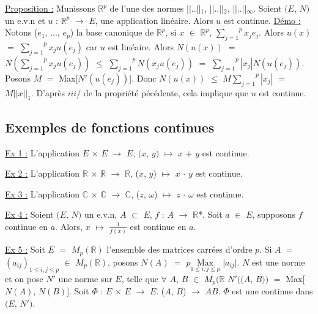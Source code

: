 \documentclass{article}
\begin{document}
\parindent=0cm
\smallbreak
\underline{Proposition :} \parindent=1cm \smallbreak
Munissons $\mathbb{R}^p$ de l'une des normes ||..||$_1$, ||..||$_2$, ||..||$_{\infty}$. Soient $(E$, $N)$ un e.v.n et $u$ : $\mathbb{R}^p$ $\longrightarrow$ $E$, une \smallbreak application linéaire. Alors $u$ est continue.
\parindent=0cm
\smallbreak
\underline{Démo :} \parindent=1cm \smallbreak
Notons ($e_1$, ..., $e_p$) la base canonique de $\mathbb{R}^p$, si $x$ $\in$ $\mathbb{R}^p$, $\overset{p}{\underset{j = 1}{\sum}}x_j e_j$. Alors $u(x)$ $=$ $\overset{p}{\underset{j = 1}{\sum}}x_j u(e_j)$ car $u$ est linéaire. \smallbreak Alors $N(u(x))$ $=$ $N( \overset{p}{\underset{j = 1}{\sum}}x_j u(e_j))$ $\leqslant$ 
$ \overset{p}{\underset{j = 1}{\sum}}N(x_j u(e_j))$ $=$ $ \overset{p}{\underset{j = 1}{\sum}}|x_j|N(u(e_j))$. Posons $M$ $=$ Max[$N'(u(e_j))$]. Donc \smallbreak $N(u(x))$ $\leqslant$ $M \overset{p}{\underset{j = 1}{\sum}}|x_j|$ $=$ $M||x||_1$. D'après $iii/$ de la propriété pécédente, cela implique que $u$ est continue.

\subsection{Exemples de fonctions continues}
\parindent=0cm
\smallbreak
\underline{Ex 1 :} \parindent=1cm \smallbreak
L'application $E$ $\times$ $E$ $\longrightarrow$ $E$, $(x$, $y)$ $\mapsto$ $x$ $+$ $y$ est continue.

\parindent=0cm
\smallbreak
\underline{Ex 2 :} \parindent=1cm \smallbreak
L'application $\mathbb{R}$ $\times$ $\mathbb{R}$ $\longrightarrow$ $\mathbb{R}$, ($x$, $y$) $\mapsto$ $x$ $\cdot$ $y$ est continue.

\parindent=0cm
\smallbreak
\underline{Ex 3 :} \parindent=1cm \smallbreak
L'application $\mathbb{C}$ $\times$ $\mathbb{C}$ $\longrightarrow$ $\mathbb{C}$, ($z$, $\omega$) $\mapsto$ $z$ $\cdot$ $\omega$ est continue.

\parindent=0cm
\smallbreak
\underline{Ex 4 :} \parindent=1cm \smallbreak
Soient $(E$, $N)$ un e.v.n, $A$ $\subset$ $E$, $f$ : $A$ $\longrightarrow$ $\mathbb{R}$*. Soit $a$ $\in$ $E$, supposons $f$ continue en $a$. Alors, $x$ $\mapsto$ $\frac{1}{f(x)}$ \smallbreak est continue en $a$.

\parindent=0cm
\smallbreak
\underline{Ex 5 :} \parindent=1cm \smallbreak
Soit $E$ $=$ $M_p(\mathbb{R})$ l'ensemble des matrices carrées d'ordre $p$. Si $A$ $=$ $(a_{ij})_{1 \leqslant i,j \leqslant p}$ $\in$ $M_p(\mathbb{R})$, posons \smallbreak $N(A)$ $=$ $p\underset{1 \leqslant i,j \leqslant p}{\text{Max}}$ |$a_{ij}$|. $N$ est une norme et on pose $N'$ une norme sur $E$, telle que $\forall$ $A$, $B$ $\in$ $M_p(\mathbb{R}$ \smallbreak $N'((A$, $B))$ $=$ Max[$N(A)$, $N(B)$]. Soit $\Phi$ : $E$ $\times$ $E$ $\longrightarrow$ $E$. ($A$, $B$) $\longrightarrow$ $AB$. $\Phi$ est une continue dans $(E$, $N')$.
\end{document}
